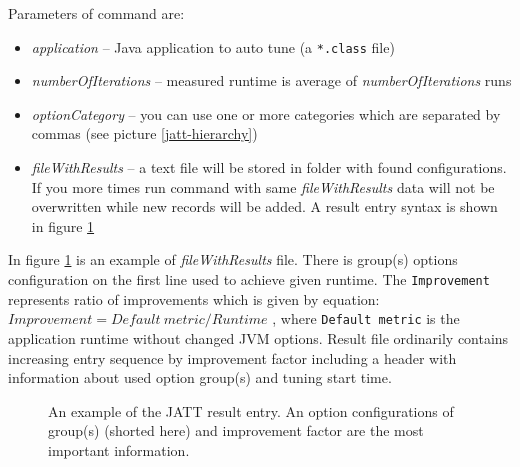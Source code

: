 \documentclass[
  digital, %
  oneside,
  notable, %
  nolof,     %
  nolot     %
]{fithesis3}
\begin{document}
Parameters of command are:
\begin{itemize}
	\item \textit{application} -- Java application to auto tune (a \texttt{*.class} file)
	\item \textit{numberOfIterations} -- measured runtime is average of \textit{numberOfIterations} runs
	\item \textit{optionCategory} -- you can use one or more categories which are separated by commas (see picture \ref{jatt-hierarchy})
	\item \textit{fileWithResults} -- a text file will be stored in \texttt{} folder with found configurations. If you more times run command with same \textit{fileWithResults} data will not be overwritten while new records will be added. A result entry syntax is shown in figure \ref{jatt-result}
\end{itemize}

In figure \ref{jatt-result} is an example of \textit{fileWithResults} file. There is group(s) options configuration on the first line used to achieve given runtime. The \texttt{Improvement} represents ratio of improvements which is given by equation: $Improvement = Default\ metric / Runtime$ \cite{jatt-web-dzone}, where \texttt{Default metric} is the application runtime without changed JVM options. Result file ordinarily contains increasing entry sequence by improvement factor including a header with information about used option group(s) and tuning start time.
\begin{figure}[h]
	\caption{An example of the JATT result entry. An option configurations of group(s) (shorted here) and improvement factor are the most important information.}
	\label{jatt-result}
\end{figure}
\end{document}

